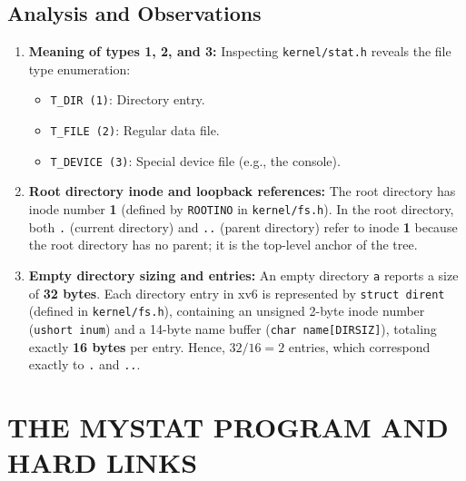 \documentclass[12pt,a4paper]{report}
\numberwithin{equation}{chapter}
\numberwithin{figure}{chapter}
\numberwithin{table}{chapter}
\begin{document}
\section{Analysis and Observations}
\begin{enumerate}
    \item \textbf{Meaning of types 1, 2, and 3:}
    Inspecting \texttt{kernel/stat.h} reveals the file type enumeration:
    \begin{itemize}
        \item \texttt{T\_DIR (1)}: Directory entry.
        \item \texttt{T\_FILE (2)}: Regular data file.
        \item \texttt{T\_DEVICE (3)}: Special device file (e.g., the console).
    \end{itemize}
    \item \textbf{Root directory inode and loopback references:}
    The root directory has inode number \textbf{1} (defined by \texttt{ROOTINO} in \texttt{kernel/fs.h}). In the root directory, both \texttt{.} (current directory) and \texttt{..} (parent directory) refer to inode \textbf{1} because the root directory has no parent; it is the top-level anchor of the tree.
    \item \textbf{Empty directory sizing and entries:}
    An empty directory \texttt{a} reports a size of \textbf{32 bytes}. Each directory entry in xv6 is represented by \texttt{struct dirent} (defined in \texttt{kernel/fs.h}), containing an unsigned 2-byte inode number (\texttt{ushort inum}) and a 14-byte name buffer (\texttt{char name[DIRSIZ]}), totaling exactly \textbf{16 bytes} per entry. Hence, $32 / 16 = 2$ entries, which correspond exactly to \texttt{.} and \texttt{..}.
\end{enumerate}

\chapter{THE MYSTAT PROGRAM AND HARD LINKS}
\end{document}
